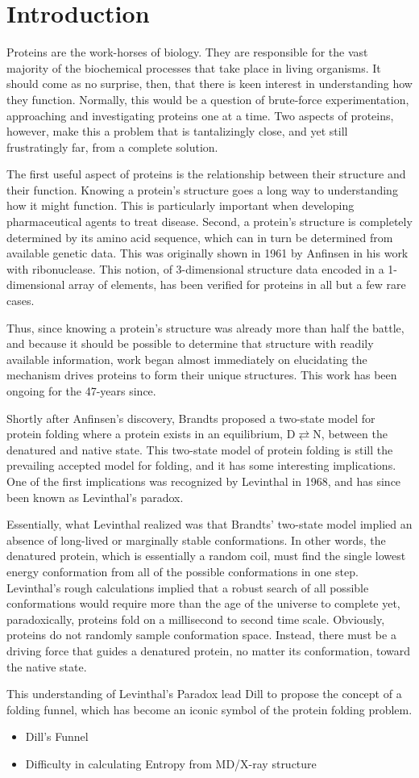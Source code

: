 \section*{Introduction}
\label{sec:introduction}
Proteins are the work-horses of biology. They are responsible for the vast majority of the biochemical processes that take place in living organisms. It should come as no surprise, then, that there is keen interest in understanding how they function. Normally, this would be a question of brute-force experimentation, approaching and investigating proteins one at a time. Two aspects of proteins, however, make this a problem that is tantalizingly close, and yet still frustratingly far, from a complete solution.

The first useful aspect of proteins is the relationship between their structure and their function. Knowing a protein's structure goes a long way to understanding how it might function. This is particularly important when developing pharmaceutical agents to treat disease. Second, a protein's structure is completely determined by its amino acid sequence, which can in turn be determined from available genetic data. This was originally shown in 1961 by Anfinsen \cite{Service:2008p294} in his work with ribonuclease. This notion, of 3-dimensional structure data encoded in a 1-dimensional array of elements, has been verified for proteins in all but a few rare cases.

Thus, since knowing a protein's structure was already more than half the battle, and because it should be possible to determine that structure with readily available information, work began almost immediately on elucidating the mechanism drives proteins to form their unique structures. This work has been ongoing for the 47-years since.

Shortly after Anfinsen's discovery, Brandts proposed a two-state model for protein folding where a protein exists in an equilibrium, $\mathbf{\mathrm{D}} \rightleftarrows \mathbf{\mathrm{N}}$, between the denatured and native state\cite{Clark:2008p141}. This two-state model of protein folding is still the prevailing accepted model for folding, and it has some interesting implications. One of the first implications was recognized by Levinthal in 1968, and has since been known as Levinthal's paradox.

Essentially, what Levinthal realized was that Brandts' two-state model implied an absence of long-lived or marginally stable conformations. In other words, the denatured protein, which is essentially a random coil, must find the single lowest energy conformation from all of the possible conformations in one step. Levinthal's rough calculations implied that a robust search of all possible conformations would require more than the age of the universe to complete yet, paradoxically, proteins fold on a millisecond to second time scale. Obviously, proteins do not randomly sample conformation space. Instead, there must be a driving force that guides a denatured protein, no matter its conformation, toward the native state.

This understanding of Levinthal's Paradox lead Dill to propose the concept of a folding funnel\cite{Dill:2008p283}, which has become an iconic symbol of the protein folding problem.

\begin{itemize}
	\item Dill's Funnel
	\item Difficulty in calculating Entropy from MD/X-ray structure
\end{itemize}

